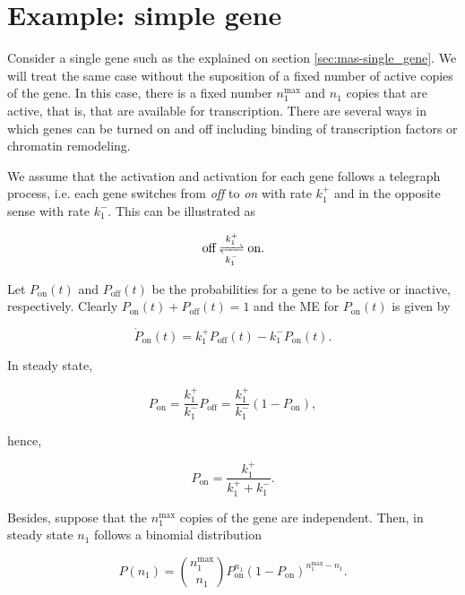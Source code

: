 \section{Example: simple gene}

Consider a single gene such as the explained on section \ref{sec:mas-single_gene}. We will treat the same case without the suposition of a fixed number of active copies of the gene. In this case, there is a fixed number $n_1^{\text{max}}$ and $n_1$ copies that are active, that is, that are available for transcription. There are several ways in which genes can be turned on and off including binding of transcription factors or chromatin remodeling.


We assume that the activation and activation for each gene follows a telegraph process, i.e. each gene switches from \textit{off} to \textit{on} with rate $k_1^+$ and in the opposite sense with rate $k_1^-$. This can be illustrated as

\begin{equation*}
  \text{off}\ce{<=>[k_1^+][k_1^-]}\text{on}.
\end{equation*}

Let $P_\text{on}(t)$ and $P_\text{off}(t)$ be the probabilities for a gene to be active or inactive, respectively. Clearly $P_\text{on}(t) + P_\text{off}(t) = 1$ and the ME for $P_\text{on}(t)$ is given by

\begin{equation*}
  \dot{P}_\text{on}(t)=k_1^+P_\text{off}(t)-k_1^-P_\text{on}(t).
\end{equation*}

In steady state,

\begin{equation*}
  P_\text{on} = \frac{k_1^+}{k_1^-}P_\text{off} = \frac{k_1^+}{k_1^-}(1-P_\text{on}),
\end{equation*}

hence,

\begin{equation*}
  P_\text{on} = \frac{k_1^+}{k_1^++k_1^-}.
\end{equation*}

Besides, suppose that the $n_1^\text{max}$ copies of the gene are independent. Then, in steady state $n_1$ follows a binomial distribution

\begin{equation*}
  P(n_1) = {n_1^\text{max}\choose n_1} P_\text{on}^{n_1}(1-P_\text{on})^{n_1^\text{max}-n_1}.
\end{equation*}

